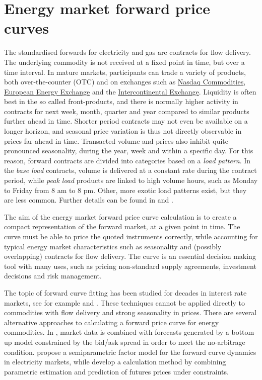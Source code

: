 \section{Energy market forward price curves}
The standardised forwards for electricity and gas are contracts for flow delivery. The underlying commodity is not received at a fixed point in time, but over a time interval. In mature markets, participants can trade a variety of products, both over-the-counter (OTC) and on exchanges such as \href{https://www.nasdaq.com/solutions/european-commodities}{Nasdaq Commodities}, \href{https://www.eex.com/en/}{European Energy Exchange} and the \href{https://www.theice.com/index}{Intercontinental Exchange}. Liquidity is often best in the so called front-products, and there is normally higher activity in contracts for next week, month, quarter and year compared to similar products further ahead in time. Shorter period contracts may not even be available on a longer horizon, and seasonal price variation is thus not directly observable in prices far ahead in time. Transacted volume and prices also inhibit quite pronounced seasonality, during the year, week and within a specific day. For this reason, forward contracts are divided into categories based on a \textit{load pattern}. In the \textit{base load} contracts, volume is delivered at a constant rate during the contract period, while \textit{peak load} products are linked to high volume hours, such as Monday to Friday from 8 am to 8 pm. Other, more exotic load patterns exist, but they are less common. Further details can be found in \citet{eydeland2002energy} and \citet{kirschen2018fundamentals}.

The aim of the energy market forward price curve calculation is to create a compact representation of the forward market, at a given point in time. The curve must be able to price the quoted instruments correctly, while accounting for typical energy market characteristics such as seasonality and (possibly overlapping) contracts for flow delivery. The curve is an essential decision making tool with many uses, such as pricing non-standard supply agreements, investment decisions and risk management.

The topic of forward curve fitting has been studied for decades in interest rate markets, see for example \citet{mcculloch1971measuring} and \citet{anderson1996estimating}. These techniques cannot be applied directly to commodities with flow delivery and strong seasonality in prices. There are several alternative approaches to calculating a forward price curve for energy commodities. In \citet{fleten2003constructing}, market data is combined with forecasts generated by a bottom-up model constrained by the bid/ask spread in order to meet the no-arbitrage condition. \citet{borak2008semiparametric} propose a semiparametric factor model for the forward curve dynamics in electricity markets, while  \citet{hildmann2012combined} develop a calculation method by combining parametric estimation and prediction of futures prices under constraints.

